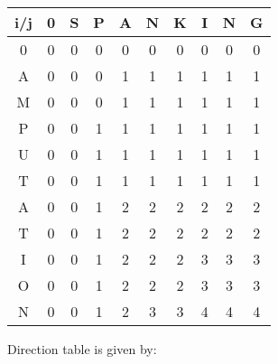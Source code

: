 \documentclass[11pt]{article}
\begin{document}
\begin{center}
 \begin{tabular}{||c c c c c c c c c c||} 
 \hline
 i/j &0& S & P & A & N & K & I & N & G \\ [0.5ex] 
 \hline\hline
 0 & 0 & 0 & 0 & 0 & 0 & 0&0&0 &0\\ 
 \hline 
 A & 0 & 0   & 0 & 1 & 1 & 1&1&1&1 \\
 \hline
 M & 0 & 0   & 0 & 1 & 1 & 1&1&1&1  \\
 \hline
 P & 0 & 0   & 1 & 1 & 1 & 1&1&1&1  \\
 \hline
 U & 0 & 0   & 1 & 1 & 1 & 1&1&1&1 \\
 \hline 
 T & 0 & 0   & 1 & 1 & 1 & 1&1&1&1 \\
 \hline
 A&0&0&1&2&2&2&2&2&2\\
 \hline
 T&0&0&1&2&2&2&2&2&2\\
 \hline
 I&0&0&1&2&2&2&3&3&3\\
 \hline
 O&0&0&1&2&2&2&3&3&3\\
 \hline
 N&0&0&1&2&3&3&4&4&4\\[0.2ex]
 \hline
\end{tabular}
\end{center}
Direction table is given by:\\
\end{document}
